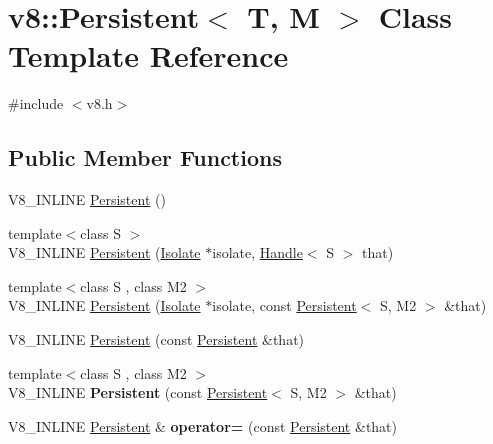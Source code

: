 \hypertarget{classv8_1_1_persistent}{}\section{v8\+:\+:Persistent$<$ T, M $>$ Class Template Reference}
\label{classv8_1_1_persistent}


{\ttfamily \#include $<$v8.\+h$>$}

\subsection*{Public Member Functions}
\begin{DoxyCompactItemize}
\item 
V8\+\_\+\+I\+N\+L\+I\+N\+E \hyperlink{classv8_1_1_persistent_a5ce14612215393683d814056015a102d}{Persistent} ()
\item 
{\footnotesize template$<$class S $>$ }\\V8\+\_\+\+I\+N\+L\+I\+N\+E \hyperlink{classv8_1_1_persistent_a37ec0a2c08eea4b397272a1a0fe0138c}{Persistent} (\hyperlink{classv8_1_1_isolate}{Isolate} $\ast$isolate, \hyperlink{classv8_1_1_handle}{Handle}$<$ S $>$ that)
\item 
{\footnotesize template$<$class S , class M2 $>$ }\\V8\+\_\+\+I\+N\+L\+I\+N\+E \hyperlink{classv8_1_1_persistent_aaf9eb7c4e6d0ef2c81a2c08238653578}{Persistent} (\hyperlink{classv8_1_1_isolate}{Isolate} $\ast$isolate, const \hyperlink{classv8_1_1_persistent}{Persistent}$<$ S, M2 $>$ \&that)
\item 
V8\+\_\+\+I\+N\+L\+I\+N\+E \hyperlink{classv8_1_1_persistent_a22331e91572784cd5ed5519739bb50c7}{Persistent} (const \hyperlink{classv8_1_1_persistent}{Persistent} \&that)
\item 
\hypertarget{classv8_1_1_persistent_ace17fd143fb6414d305871bf0a53ef57}{}{\footnotesize template$<$class S , class M2 $>$ }\\V8\+\_\+\+I\+N\+L\+I\+N\+E {\bfseries Persistent} (const \hyperlink{classv8_1_1_persistent}{Persistent}$<$ S, M2 $>$ \&that)\label{classv8_1_1_persistent_ace17fd143fb6414d305871bf0a53ef57}

\item 
\hypertarget{classv8_1_1_persistent_aa1db9923b3212fb8ce57868217858b39}{}V8\+\_\+\+I\+N\+L\+I\+N\+E \hyperlink{classv8_1_1_persistent}{Persistent} \& {\bfseries operator=} (const \hyperlink{classv8_1_1_persistent}{Persistent} \&that)\label{classv8_1_1_persistent_aa1db9923b3212fb8ce57868217858b39}


\end{DoxyCompactItemize}
